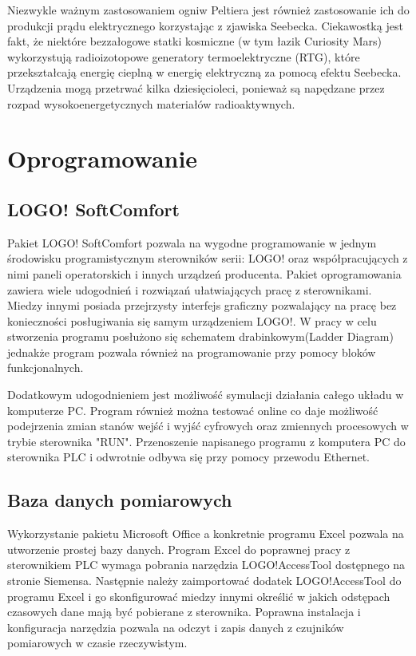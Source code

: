 \documentclass[oneside]{mgr}
\begin{document}
Niezwykle ważnym zastosowaniem ogniw Peltiera jest również zastosowanie ich do produkcji prądu elektrycznego korzystając z zjawiska Seebecka. Ciekawostką jest fakt, że niektóre bezzałogowe statki kosmiczne (w tym łazik Curiosity Mars) wykorzystują radioizotopowe generatory termoelektryczne (RTG), które przekształcają energię cieplną w energię elektryczną za pomocą efektu Seebecka. Urządzenia mogą przetrwać kilka dziesięcioleci, ponieważ są napędzane przez rozpad wysokoenergetycznych materiałów radioaktywnych.

\chapter{Oprogramowanie}
\section{LOGO! SoftComfort}
Pakiet LOGO! SoftComfort pozwala na wygodne programowanie w jednym środowisku programistycznym sterowników serii: LOGO! oraz współpracujących z nimi paneli operatorskich i innych urządzeń producenta. Pakiet oprogramowania zawiera wiele udogodnień i rozwiązań ułatwiających pracę z sterownikami. Miedzy innymi posiada przejrzysty interfejs graficzny pozwalający na pracę bez konieczności posługiwania się samym urządzeniem LOGO!. W pracy w celu stworzenia programu posłużono się schematem drabinkowym(Ladder Diagram) jednakże program pozwala również na programowanie przy pomocy bloków funkcjonalnych.

Dodatkowym udogodnieniem jest możliwość symulacji działania całego układu w komputerze PC. Program również można testować online co daje możliwość podejrzenia zmian stanów wejść i wyjść cyfrowych oraz zmiennych procesowych w trybie sterownika "RUN". Przenoszenie napisanego programu z komputera PC do sterownika PLC i odwrotnie odbywa się przy pomocy przewodu Ethernet.

\section{Baza danych pomiarowych}
Wykorzystanie pakietu Microsoft Office a konkretnie programu Excel pozwala na utworzenie prostej bazy danych. Program Excel do poprawnej pracy z sterownikiem PLC wymaga pobrania narzędzia LOGO!AccessTool dostępnego na stronie Siemensa. Następnie należy zaimportować dodatek LOGO!AccessTool do programu Excel i go skonfigurować miedzy innymi określić w jakich odstępach czasowych dane mają być pobierane z sterownika.  Poprawna instalacja i konfiguracja narzędzia pozwala na odczyt i zapis danych z czujników pomiarowych w czasie rzeczywistym. 
\end{document}
